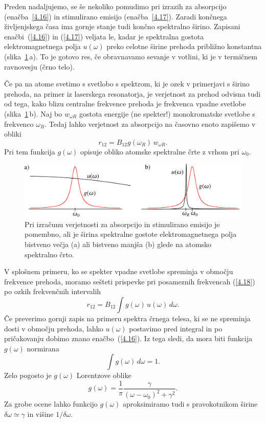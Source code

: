 Preden nadaljujemo, se še nekoliko pomudimo pri izrazih za absorpcijo
(enačba~\ref{4.16}) in stimulirano emisijo (enačba~\ref{4.17}).
Zaradi končnega življenjskega časa ima gornje
stanje tudi končno spektralno širino. Zapisani enačbi~(\ref{4.16}) in (\ref{4.17})
veljata le, kadar je spektralna gostota elektromagnetnega polja $u(\omega)$
preko celotne širine prehoda približno konstantna (slika~\ref{fig:spektri}\,a). To je gotovo res, če
obravnavamo sevanje v votlini, ki je v termičnem ravnovesju (črno telo). 

Če pa na atome svetimo s svetlobo s spektrom, ki je ozek v primerjavi s širino prehoda, na
primer iz laserskega resonatorja, je verjetnost za prehod odvisna tudi od tega, kako
blizu centralne frekvence prehoda je frekvenca vpadne svetlobe (slika~\ref{fig:spektri}\,b). 
Naj bo $w_{\omega R}$ gostota energije (ne spekter!) monokromatske svetlobe s frekvenco
$\omega_R$. Tedaj lahko verjetnost za absorpcijo na časovno enoto zapišemo
v obliki 
\begin{equation}
r_{12}=B_{12}g(\omega_R)\, w_{\omega R}.
\label{4.18}
\end{equation}
Pri tem funkcija $g(\omega)$ opisuje obliko atomske spektralne črte z vrhom 
pri $\omega_{0}$. \\
\begin{figure}[h]
\centering
\includegraphics[width=12truecm]{slike/05_Spektri.png}
\caption{Pri izračunu verjetnosti za absorpcijo in stimulirano emisijo je pomembno, ali je 
širina spektralne gostote elektromagnetnega polja bistveno večja (a) ali bistveno manjša (b)
glede na atomsko spektralno črto.}
\label{fig:spektri}
\end{figure}

V splošnem primeru, ko se spekter vpadne svetlobe spreminja v območju 
frekvence prehoda, moramo sešteti prispevke pri posameznih frekvencah (\ref{4.18}) 
po ozkih frekvenčnih intervalih
\begin{equation}
r_{12}=B_{12}\int g(\omega)\, u(\omega)\, d\omega.
\label{4.19}
\end{equation}
Če preverimo gornji zapis na primeru spektra črnega telesa, ki se ne spreminja 
dosti v območju prehoda, lahko $u(\omega)$ postavimo pred integral in po pričakovanju
dobimo znano enačbo~(\ref{4.16}). Iz tega sledi, da mora biti funkcija $g(\omega)$ normirana
\begin{equation}
\int g(\omega)\, d\omega=1.
\label{4.20}
\end{equation}
Zelo pogosto je $g(\omega)$ Lorentzove oblike
\begin{equation}
g(\omega)=\frac{1}{\pi}\frac{\gamma}{(\omega-\omega_{0})^{2}+\gamma^{2}}.
\label{4.21}
\end{equation}
Za grobe ocene lahko funkcijo $g(\omega)$ aproksimiramo tudi s pravokotnikom širine
$\delta\omega\simeq\gamma$ in višine $1/\delta\omega$.

